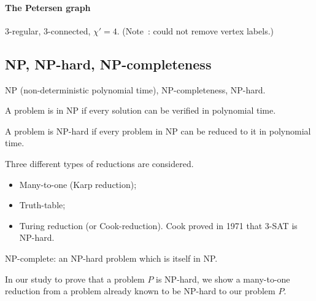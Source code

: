 \documentclass[12pt,a4paper]{article}
\begin{document}
\begin{center}
\end{center}

\paragraph{The Petersen graph}
\(3\)-regular, \(3\)-connected, \(\chi' = 4\). (Note~: could not remove vertex
labels.)
\begin{center}
\end{center}

\subsection{NP, NP-hard, NP-completeness}

NP (non-deterministic polynomial time), NP-completeness, NP-hard.

A problem is in NP if every solution can be verified in polynomial time.

A problem is NP-hard if every problem in NP can be reduced to it in polynomial
time.

Three different types of reductions are considered.
\begin{itemize}
\item Many-to-one (Karp reduction);
\item Truth-table;
\item Turing reduction (or Cook-reduction). Cook proved in 1971 that \(3\)-SAT
  is NP-hard.
\end{itemize}

NP-complete: an NP-hard problem which is itself in NP.\@

In our study to prove that a problem \(P\) is NP-hard, we show a many-to-one
reduction from a problem already known to be NP-hard to our problem \(P\).
\end{document}

